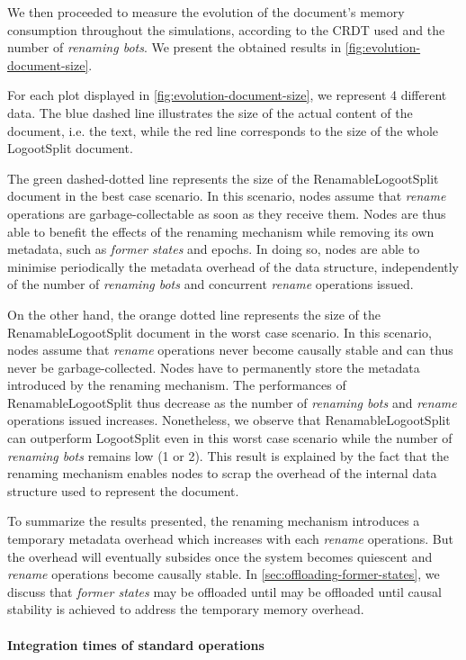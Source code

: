\documentclass[sigplan,10pt]{acmart}
\newcommand{\ie}{i.e. }
\begin{document}
We then proceeded to measure the evolution of the document's memory consumption throughout the simulations, according to the CRDT used and the number of \emph{renaming bots}.
We present the obtained results in \autoref{fig:evolution-document-size}.

For each plot displayed in \autoref{fig:evolution-document-size}, we represent 4 different data.
The blue dashed line illustrates the size of the actual content of the document, \ie the text, while the red line corresponds to the size of the whole LogootSplit document.

The green dashed-dotted line represents the size of the RenamableLogootSplit document in the best case scenario.
In this scenario, nodes assume that \emph{rename} operations are garbage-collectable as soon as they receive them.
Nodes are thus able to benefit the effects of the renaming mechanism while removing its own metadata, such as \emph{former states} and epochs.
In doing so, nodes are able to minimise periodically the metadata overhead of the data structure, independently of the number of \emph{renaming bots} and concurrent \emph{rename} operations issued.

On the other hand, the orange dotted line represents the size of the RenamableLogootSplit document in the worst case scenario.
In this scenario, nodes assume that \emph{rename} operations never become causally stable and can thus never be garbage-collected.
Nodes have to permanently store the metadata introduced by the renaming mechanism.
The performances of RenamableLogootSplit thus decrease as the number of \emph{renaming bots} and \emph{rename} operations issued increases.
Nonetheless, we observe that RenamableLogootSplit can outperform LogootSplit even in this worst case scenario while the number of \emph{renaming bots} remains low (1 or 2).
This result is explained by the fact that the renaming mechanism enables nodes to scrap the overhead of the internal data structure used to represent the document.

To summarize the results presented, the renaming mechanism introduces a temporary metadata overhead which increases with each \emph{rename} operations.
But the overhead will eventually subsides once the system becomes quiescent and \emph{rename} operations become causally stable.
In \autoref{sec:offloading-former-states}, we discuss that \emph{former states} may be offloaded until may be offloaded until causal stability is achieved to address the temporary memory overhead.

\paragraph{Integration times of standard operations}
\end{document}

